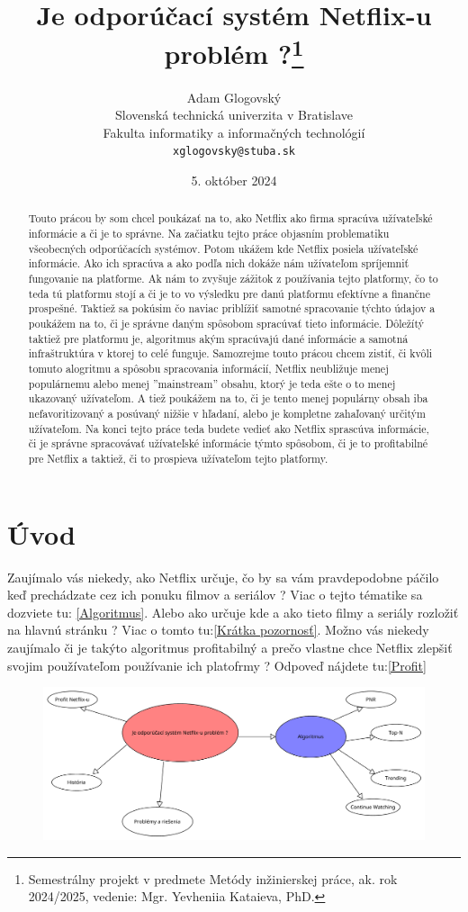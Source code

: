 \documentclass[10pt,twoside,slovak,a4paper]{article}
\title{Je odporúčací systém Netflix-u problém ?\thanks{Semestrálny projekt v predmete Metódy inžinierskej práce, ak. rok 2024/2025, vedenie: Mgr. Yevheniia Kataieva, PhD.}}
\author{Adam Glogovský\\[2pt]
	{\small Slovenská technická univerzita v Bratislave}\\
	{\small Fakulta informatiky a informačných technológií}\\
	{\small \texttt{xglogovsky@stuba.sk}}}
\date{\small 5. október 2024}
\begin{document}
\maketitle
\begin{abstract}
	Touto prácou by som chcel poukázať na to, ako Netflix ako firma spracúva užívateľské informácie a či je to správne. Na začiatku tejto práce objasním problematiku všeobecných odporúčacích systémov. Potom ukážem kde Netflix posiela užívateľské informácie. Ako ich spracúva a ako podľa nich dokáže nám užívateľom spríjemniť fungovanie na platforme. Ak nám to zvyšuje zážitok z používania tejto platformy, čo to teda tú platformu stojí a či je to vo výsledku pre danú platformu efektívne a finančne prospešné. Taktiež sa pokúsim čo naviac priblížiť samotné spracovanie týchto údajov a poukážem na to, či je správne daným spôsobom spracúvať tieto informácie.\cite{amatriain2015recommender}
	Dôležítý taktiež pre platformu je, algoritmus akým spracúvajú dané informácie a samotná infraštruktúra v ktorej to celé funguje. Samozrejme touto prácou chcem zistiť, či kvôli tomuto alogritmu a spôsobu spracovania informácií, Netflix neubližuje menej populárnemu alebo menej ''mainstream'' obsahu, ktorý je teda ešte o to menej ukazovaný užívateľom. A tiež poukážem na to, či je tento menej populárny obsah iba nefavoritizovaný a posúvaný nižšie v hľadaní, alebo je kompletne zahaľovaný určitým užívateľom. Na konci tejto práce teda budete vedieť ako Netflix sprascúva informácie, či je správne spracovávať užívateľské informácie týmto spôsobom, či je to profitabilné pre Netflix a taktiež, či to prospieva užívateľom tejto platformy.
\end{abstract}

\section*{Úvod}
Zaujímalo vás niekedy, ako Netflix určuje, čo by sa vám pravdepodobne páčilo keď prechádzate cez ich ponuku filmov a seriálov ? Viac o tejto tématike sa dozviete tu: \ref{Algoritmus}. Alebo ako určuje kde a ako tieto filmy a seriály rozložiť na hlavnú stránku ? Viac o tomto tu:\ref{Krátka pozornosť}. Možno vás niekedy zaujímalo či je takýto algoritmus profitabilný a prečo vlastne chce Netflix zlepšiť svojim používateľom používanie ich platofrmy ? Odpoveď nájdete tu:\ref{Profit}

\newpage
\begin{figure}[h]
	\centering
	\includegraphics[scale=0.2]{UvodnyDiagram.pdf}
\end{figure}
\end{document}
